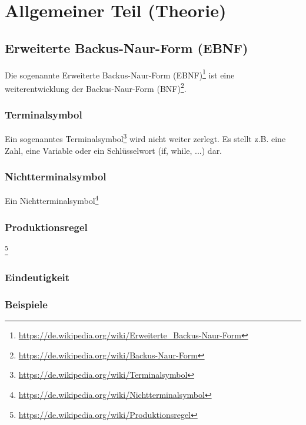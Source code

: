 

\section{Allgemeiner Teil (Theorie)}

\subsection{Erweiterte Backus-Naur-Form (EBNF)}

Die sogenannte Erweiterte Backus-Naur-Form (EBNF)\footnote{\url{https://de.wikipedia.org/wiki/Erweiterte_Backus-Naur-Form}} ist eine weiterentwicklung der Backus-Naur-Form (BNF)\footnote{\url{https://de.wikipedia.org/wiki/Backus-Naur-Form}}.

\subsubsection{Terminalsymbol}

Ein sogenanntes Terminalsymbol\footnote{\url{https://de.wikipedia.org/wiki/Terminalsymbol}} wird nicht weiter zerlegt. Es stellt z.B. eine Zahl, eine Variable oder ein Schlüsselwort (if, while, ...) dar.

\subsubsection{Nichtterminalsymbol}

Ein Nichtterminalsymbol\footnote{\url{https://de.wikipedia.org/wiki/Nichtterminalsymbol}}

\subsubsection{Produktionsregel}

\footnote{\url{https://de.wikipedia.org/wiki/Produktionsregel}}

\subsubsection{Eindeutigkeit}

\subsubsection{Beispiele}

